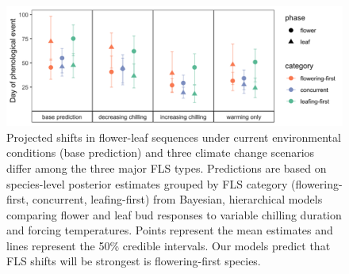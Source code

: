 \documentclass[11pt]{article}\usepackage[]{graphicx}\usepackage[]{color}
\begin{document}
\begin{figure}[h!]
    \centering
 \includegraphics[width=\textwidth]{..//Plots/Flobuds_manuscript_figs/posteriorgroups_go.png}
    \caption{Projected shifts in flower-leaf sequences under current environmental conditions (base prediction) and three climate change scenarios differ among the three major FLS types. Predictions are based on species-level posterior estimates grouped by FLS category (flowering-first, concurrent, leafing-first) from Bayesian, hierarchical models comparing flower and leaf bud responses to variable chilling duration and forcing temperatures. Points represent the mean estimates and lines represent the 50\% credible intervals. Our models predict that FLS shifts will be strongest is flowering-first species.}
    \label{fig:preddy}
\end{figure}
\end{document}
